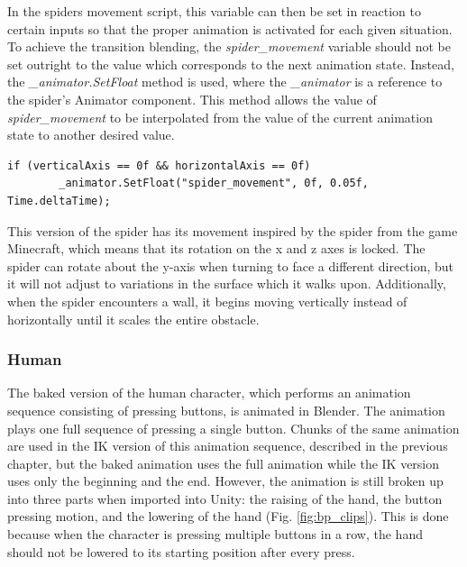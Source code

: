 In the spiders movement script, this variable can then be set in reaction to
certain inputs so that the proper animation is activated for each given situation.
To achieve the transition blending, the \textit{spider\_movement} variable
should not be set outright to the value which corresponds to the next animation
state. Instead, the \textit{\_animator.SetFloat} method is used, where the
\textit{\_animator} is a reference to the spider's Animator component. This
method allows the value of \textit{spider\_movement} to be interpolated from the value of
the current animation state to another desired value.
\newline
\begin{lstlisting}[basicstyle=\footnotesize, numbers=none,frame=single,
caption={Transitioning to the spider's idle animation using the
\textit{SetFloat} method},captionpos=b, label=stretch, language={[Sharp]c}]
    if (verticalAxis == 0f && horizontalAxis == 0f)
        _animator.SetFloat("spider_movement", 0f, 0.05f, Time.deltaTime);
\end{lstlisting}

This version of the spider has its movement inspired by the spider from the game
Minecraft, which means that its rotation on the x and z axes is locked. The
spider can rotate about the y-axis when turning to face a different direction,
but it will not adjust to variations in the surface which it walks upon.
Additionally, when the spider encounters a wall, it begins moving
vertically instead of horizontally until it scales the entire obstacle.

\subsubsection{Human}
The baked version of the human character, which performs an animation sequence
consisting of pressing buttons, is animated in Blender. The animation plays one
full sequence of pressing a single button. Chunks of the same animation are used
in the IK version of this animation sequence, described in the previous chapter,
but the baked animation uses the full animation while the IK version uses only
the beginning and the end. However, the animation is still broken up into three
parts when imported into Unity: the raising of the hand, the button pressing
motion, and the lowering of the hand (Fig. \ref{fig:bp_clips}). This is done
because when the character is pressing multiple buttons in a row, the hand
should not be lowered to its starting position after every press.


